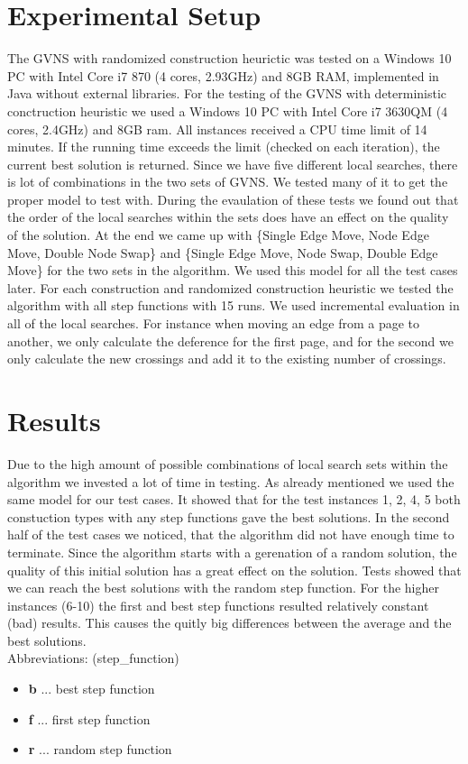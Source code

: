 \documentclass[11pt]{article}
\begin{document}
\section{Experimental Setup}
\hspace{0.5cm} The GVNS with randomized construction heurictic was tested on a Windows 10 PC with Intel Core i7 870 (4 cores, 2.93GHz) and 8GB RAM, implemented in Java without external libraries. For the testing of the GVNS with deterministic conctruction heuristic we used a Windows 10 PC with Intel Core i7 3630QM (4 cores, 2.4GHz) and 8GB ram. All instances received a CPU time limit of 14 minutes. If the running time exceeds the limit (checked on each iteration), the current best solution is returned. Since we have five different local searches, there is lot of combinations in the two sets of GVNS. We tested many of it to get the proper model to test with. During the evaulation of these tests we found out that the order of the local searches within the sets does have an effect on the quality of the solution. At the end we came up with \{Single Edge Move, Node Edge Move, Double Node Swap\} and \{Single Edge Move, Node Swap, Double Edge Move\} for the two sets in the algorithm. We used this model for all the test cases later. For each construction and randomized construction heuristic we tested the algorithm with all step functions with 15 runs. We used incremental evaluation in all of the local searches. For instance when moving an edge from a page to another, we only calculate the deference for the first page, and for the second we only calculate the new crossings and add it to the existing number of crossings.\\
\section{Results}
\hspace{0.5cm} Due to the high amount of possible combinations of local search sets within the algorithm we invested a lot of time in testing. As already mentioned we used the same model for our test cases. It showed that for the test instances 1, 2, 4, 5 both constuction types with any step functions gave the best solutions. In the second half of the test cases we noticed, that the algorithm did not have enough time to terminate. Since the algorithm starts with a gerenation of a random solution, the quality of this initial solution has a great effect on the solution. Tests showed that we can reach the best solutions with the random step function. For the higher instances (6-10) the first and best step functions resulted relatively constant (bad) results. This causes the quitly big differences between the average and the best solutions.\\
\newline
Abbreviations: (step\_function)
\begin{itemize}
	\item \textbf{b} ... best step function
	\item \textbf{f} ... first step function
	\item \textbf{r} ... random step function
\end{itemize}
\end{document}
